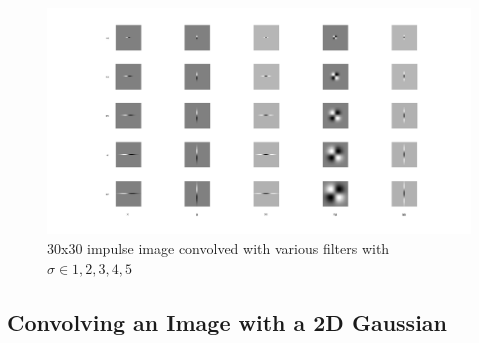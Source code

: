 \documentclass[a4paper,10pt]{article}
\begin{document}
\begin{figure}[ht]
\centering
\includegraphics[width=\textwidth]{zebra_img/impulse}
\caption{30x30 impulse image convolved with various filters with $\sigma \in {1,2,3,4,5}$}
\label{fig:impulse}
\end{figure}



\subsection{Convolving an Image with a 2D Gaussian}
\end{document}
